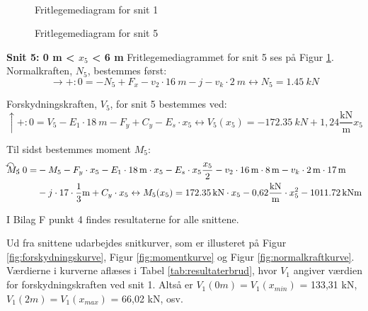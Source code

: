 \begin{figure}[H]
\begin{minipage}[b]{0.48\textwidth}
	\end{minipage}\\ %
	\begin{minipage}[t]{0.48\textwidth}
		\caption{Fritlegemediagram for snit 1} %
		\label{fig:snitet}
	\end{minipage}\hfill
	\begin{minipage}[t]{0.48\textwidth}
		\caption{Fritlegemediagram for snit 5} %
		\label{fig:snitfem}
	\end{minipage}
\end{figure}

\textbf{Snit 5: 0 m < $x_5$ < 6 m}
\newline
Fritlegemediagrammet for snit 5 ses på Figur \ref{fig:snitfem}.
\newline
\newline
Normalkraften, $N_5$, bestemmes først:
\begin{equation}
	\rightarrow+: 0 = - N_5 + F_x - v_2 \cdot \SI{16}{m} - j - v_k \cdot \SI{2}{m} \leftrightarrow N_5 = \SI{1,45}{kN}
\end{equation}

Forskydningskraften, $V_5$, for snit 5 bestemmes ved:
\begin{equation}
	\uparrow+: 0 = V_5 - E_1 \cdot \SI{18}{m} - F_y + C_y - E_s \cdot x_5 \leftrightarrow V_5(x_5) = \SI{-172,35}{kN} + 1,\!24 \frac{\text{kN}}{\text{m}}x_5
\end{equation}

Til sidst bestemmes moment $M_5$:
\begin{equation}
\begin{split}
	\ALN{\text{$M_5$}} : 0 = & - M_5 - F_y \cdot x_5 - E_1 \cdot \SI{18}{m} \cdot x_5 - E_s \cdot x_5 \frac{x_5}{2} - v_2 \cdot \SI{16}{m} \cdot \SI{8}{m} - v_k \cdot \SI{2}{m} \cdot \SI{17}{m} \\ & - j \cdot 17 \cdot \frac{1}{3} \text{m} + C_y \cdot x_5 \leftrightarrow M_5(x_5) =  \SI{172,35}{kN} \cdot x_5 - 0,\!62 \frac{\text{kN}}{\text{m}} \cdot x_5^2 - \SI{1011,72}{kNm}
\end{split}
\end{equation}

I Bilag F punkt 4 findes resultaterne for alle snittene. 


Ud fra snittene udarbejdes snitkurver, som er illusteret på Figur \ref{fig:forskydningskurve}, Figur \ref{fig:momentkurve} og Figur \ref{fig:normalkraftkurve}. Værdierne i kurverne aflæses i Tabel \ref{tab:resultaterbrud}, hvor $V_1$ angiver værdien for forskydningskraften ved snit 1. Altså er $V_1(0m) = V_1(x_{min})$ = 133,31 kN, $V_1(2m) = V_1(x_{max})$ = 66,02 kN, osv.

